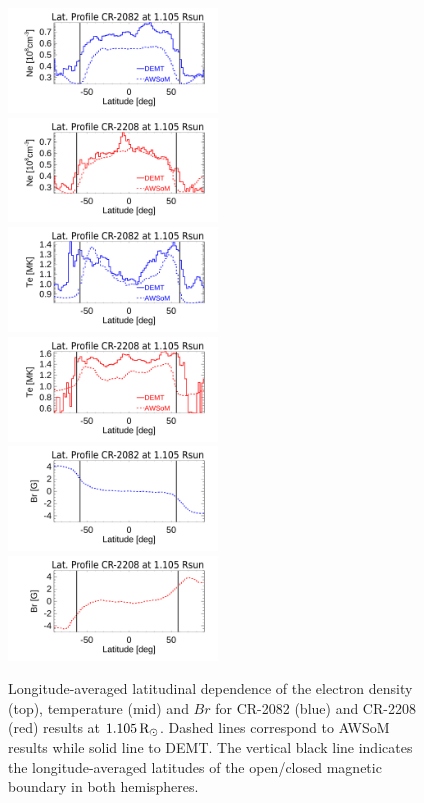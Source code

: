 \documentclass[namedreferences]{solarphysics}
\newcommand{\mrsun}{{\rm R_\odot}}
\begin{document}
\begin{article}
\begin{figure}[h!]
\begin{center}
\includegraphics[width=0.495\textwidth]{figs/Perfil_Ne_demt_awsom_2082_1105_2.pdf}
\includegraphics[width=0.495\textwidth]{figs/Perfil_Ne_demt_awsom_2208_1105_2.pdf}
\includegraphics[width=0.495\textwidth]{figs/Perfil_Te_demt_awsom_2082_1105_2.pdf}
\includegraphics[width=0.495\textwidth]{figs/Perfil_Te_demt_awsom_2208_1105_2.pdf}
\includegraphics[width=0.495\textwidth]{figs/Perfil_Br_2082_1105_2.pdf}
\includegraphics[width=0.495\textwidth]{figs/Perfil_Br_2208_1105_2.pdf}
\caption{Longitude-averaged latitudinal dependence of the electron density (top), temperature (mid) and $Br$ for CR-2082 (blue) and CR-2208 (red) results at $1.105\,\mrsun$. Dashed lines correspond to AWSoM results while solid line to DEMT. The vertical black line indicates the longitude-averaged latitudes of the open/closed magnetic boundary in both hemispheres.}
\label{perf_lat}
\end{center}
\end{figure}


\end{article}
\end{document}
